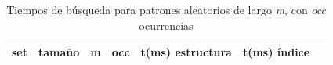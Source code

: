 \begin{table}[h!]
\centering
\begin{tabular}{|l|l|c|c|c|c|c|}
\hline
\textbf{set} & \textbf{tamaño} & \textbf{m} & \textbf{occ} & \textbf{t(ms) estructura} & t(ms) índice \\ \hline  

\hline
\end{tabular}
\caption{Tiempos de búsqueda para patrones aleatorios de largo \textit{m}, con \textit{occ} ocurrencias}
\label{tab:runtimes4}
\end{table}
